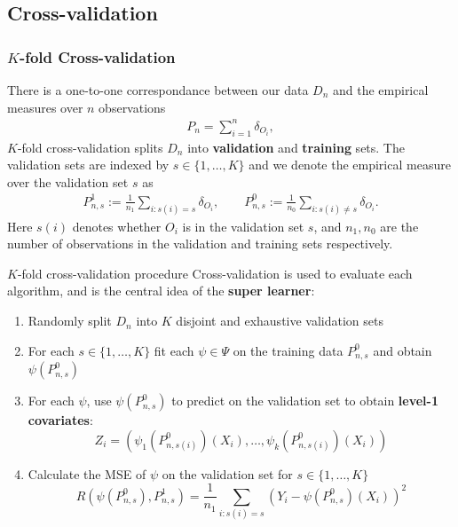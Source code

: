 \documentclass{beamer}
\newcommand{\ml}{k}
\newcommand{\la}{\psi}
\newcommand{\lib}{\Psi}
\begin{document}
\subsection{Cross-validation}
\begin{frame}
\frametitle{$ K $-fold Cross-validation}
There is a one-to-one correspondance between our data $ D_n $ and the empirical measures over $ n $ observations
\begin{align*}
    P_n = \sum_{i = 1}^{n} \delta_{O_i},
\end{align*}
$ K $-fold cross-validation splits $ D_n $ into \textbf{validation} and \textbf{training} sets. The validation sets are indexed by $ s \in \{1, \dots , K\} $ and we denote the empirical measure over the validation set $ s $ as 
\begin{align*}
    P_{n,s}^{1} := \frac{1}{n_1} \sum_{i: s(i) = s} \delta_{O_i}, \qquad P_{n,s}^{0} := \frac{1}{n_0} \sum_{i: s(i) \neq s} \delta_{O_i}. 
\end{align*}
Here $ s(i) $ denotes whether $ O_i$ is in the validation set $ s $, and $ n_1, n_0 $ are the number of observations in the validation and training sets respectively. 
\end{frame}

\begin{frame}
\begin{exampleblock}{$ K $-fold cross-validation procedure}
Cross-validation is used to evaluate each algorithm, and is the central idea of the \textbf{super learner}:
    \begin{enumerate}
        \item Randomly split $ D_n $ into $ K $ disjoint and exhaustive validation sets
        \item For each $ s \in \{1, \dots , K\} $ fit each $ \la \in \lib $ on the training data $ P_{n, s}^{0} $ and obtain $ \la(P_{n, s}^{0}) $ 
        \item For each $ \la $, use $ \la(P_{n, s}^{0}) $ to predict on the validation set to obtain \textbf{level-1 covariates}: $$ Z_i = \left(\la_1(P_{n, s(i)}^{0})(X_i), \dots ,\la_\ml(P_{n, s(i)}^{0})(X_i)\right)  $$
        \item Calculate the MSE of $ \la $ on the validation set for $ s \in \{1, \dots, K \}$ 
            $$ R(\la(P_{n, s}^{0}) , P_{n, s}^{1}) = \frac{1}{n_1} \sum_{i : s(i) = s} \left(Y_i - \la(P_{n, s}^{0})(X_i)\right)^2 $$ 
    \end{enumerate}
\end{exampleblock}
\end{frame}
\end{document}
